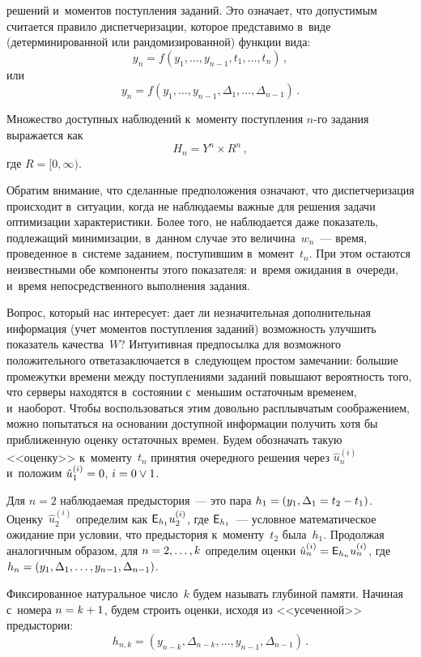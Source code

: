 \begin{multicols}{2}
\pagebreak

\noindent
 решений 
и~моментов поступления заданий. Это означает, что допустимым считается правило 
диспетчеризации, которое представимо в~виде (детерминированной или 
рандомизированной) функции вида:
$$
y_n= f\left(y_1, \ldots, y_{n-1}, t_1,\ldots, t_n\right)\,,
$$
или
$$
y_n= f\left( y_1,\ldots, y_{n-1}, \Delta_1,\ldots , \Delta_{n-1}\right)\,.
$$
    
    Множество доступных наблюдений к~моменту поступления $n$-го задания выражается 
как
    $$
    H_n=Y^n\times R^n\,,
    $$
где $R=[0,\infty)$.
    
    Обратим внимание, что сделанные предположения означают, что диспетчеризация 
происходит в~ситуации, когда не наблюдаемы важные для решения задачи оптимизации 
характеристики. Более того, не наблюдается даже показатель, подлежащий минимизации, 
в~данном случае это величина~$w_n$~--- время, проведенное в~системе заданием, 
поступившим в~момент~$t_n$. При этом остаются неизвестными обе компоненты этого 
показателя: и~время ожидания в~очереди, и~время непосредственного выполнения задания.
    
    Вопрос, который нас интересует: дает ли незначительная дополнительная информация 
(учет\linebreak
 моментов поступления заданий) возможность улучшить показатель качества~$W$? 
Интуитивная пред\-посылка для возможного положительного ответа\linebreak заключает\-ся 
в~следующем простом замечании: большие промежутки времени между поступлениями 
заданий повышают вероятность того, что серверы находятся в~состоянии с~меньшим 
остаточным временем, и~наоборот. Чтобы воспользоваться этим довольно расплывчатым 
соображением, можно попытаться на основании доступной информации получить хотя бы 
приближенную оценку остаточных времен. Будем обозначать такую <<оценку>> 
к~моменту~$t_n$ принятия очередного решения через $\hat{u}_n^{(i)}$ и~положим 
$\hat{u}_1^{(i)}\hm=0$, $i\hm=0\vee 1$.
    
    Для $n=2$ наблюдаемая предыстория~--- это пара $h_1\hm= (y_1,\Delta_1=t_2-t_1)$. 
Оценку~$\hat{u}_2^{(i)}$ определим как ${\sf E}_{h_1} u_2^{(i)}$, 
    где ${\sf E}_{h_1}$~--- условное математическое ожидание при условии, что 
предыстория к~моменту~$t_2$ была~$h_1$. Продолжая аналогичным образом, для 
$n\hm=2,\ldots, k$ определим оценки $\hat{u}_n^{(i)}\hm= {\sf E}_{h_n} u_n^{(i)}$, где 
$h_n\hm= (y_1,\Delta_1,\ldots , y_{n-1}, \Delta_{n-1})$.
    
    Фиксированное натуральное число~$k$ будем называть глубиной памяти. Начиная 
с~номера $n\hm= k\hm+1$, будем строить оценки, исходя из <<усеченной>> предыстории:
$$
h_{n,k}=\left( y_{n-k},\Delta_{n-k},\ldots ,y_{n-1}, \Delta_{n-1}\right)\,.
$$
    

\end{multicols}
